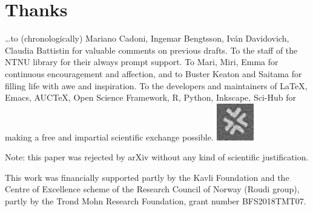 \documentclass[\ifafour a4paper,12pt,\else a5paper,10pt,\fi%
onecolumn,oneside,article,%
british%
]{memoir}
\theoremstyle{remark}
\theoremstyle{innote}
\renewcommand*{\finalnamedelim}{\addspace\amp\space}
\newcommand*{\amp}{\&}
\newenvironment{acknowledgements}{\section*{Thanks}\addcontentsline{toc}{section}{Thanks}}{\par}
\newcommand*\autanet{\includegraphics[height=\heightof{M}]{autanet.pdf}}
\renewcommand*{\|}[1][]{\nonscript\,#1\vert\nonscript\;\mathopen{}}
\begin{document}



\begin{acknowledgements}
  \ldots to (chronologically) Mariano Cadoni, Ingemar Bengtsson, Iv\'an
  Davidovich, Claudia Battistin for valuable comments on previous drafts.
  To the staff of the NTNU library for their always prompt support. To
  Mari, Miri, Emma for continuous encouragement and affection, and to
  Buster Keaton and Saitama for filling life with awe and inspiration. To
  the developers and maintainers of \LaTeX, Emacs, AUC\TeX, Open Science
  Framework, R, Python, Inkscape, Sci-Hub for making a free and impartial
  scientific exchange possible. \mbox{}\hfill\autanet

  Note: this paper was rejected by arXiv without any kind of scientific
  justification. %
  
  This work was financially supported partly by the Kavli Foundation and the
  Centre of Excellence scheme of the Research Council of Norway (Roudi
  group), partly by the Trond Mohn Research Foundation, grant number BFS2018TMT07.
\end{acknowledgements}


\renewcommand*{\finalnamedelim}{\addcomma\space}

\printbibliography[prenote=prenote%
]
\end{document}
